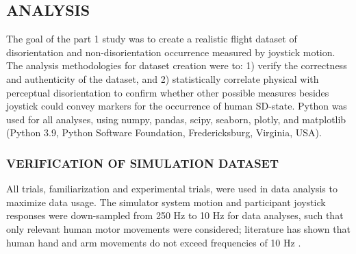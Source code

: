 \documentclass{ieeeaccess}
\begin{document}
\subsection{ANALYSIS}
The goal of the part 1 study was to create a realistic flight dataset of disorientation and non-disorientation occurrence measured by joystick motion. The analysis methodologies for dataset creation were to: 1) verify the correctness and authenticity of the dataset, and 2) statistically correlate physical with perceptual disorientation to confirm whether other possible measures besides joystick could convey markers for the occurrence of human SD-state. Python was used for all analyses, using numpy, pandas, scipy, seaborn, plotly, and matplotlib (Python 3.9, Python Software Foundation, Fredericksburg, Virginia, USA).

\subsubsection{VERIFICATION OF SIMULATION DATASET}
\label{VERIFICATION_OF_SIMULATION_DATASET}
All trials, familiarization and experimental trials, were used in data analysis to maximize data usage. The simulator system motion and participant joystick responses were down-sampled from 250 Hz to 10 Hz for data analyses, such that only relevant human motor movements were considered; literature has shown that human hand and arm movements do not exceed frequencies of 10 Hz \cite{Shadmehr_2004_Computational}.
\end{document}
